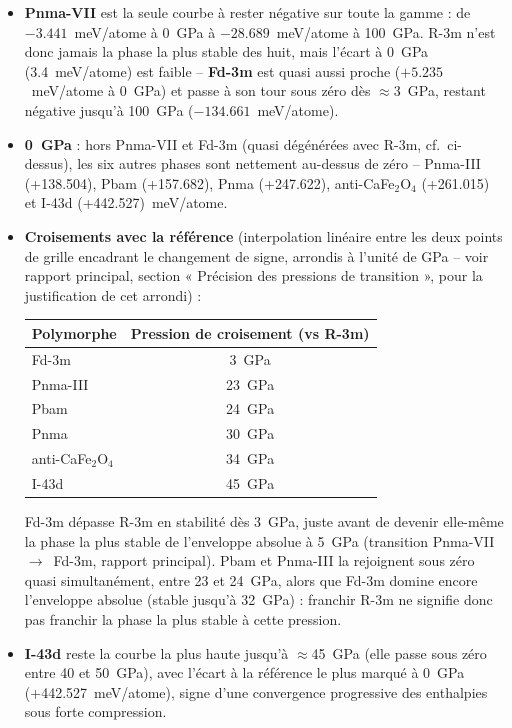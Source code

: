 \documentclass[11pt,a4paper]{article}
\begin{document}
\begin{itemize}
  \item \textbf{Pnma-VII} est la seule courbe à rester négative sur toute la gamme : de
  $-3.441$~meV/atome à 0~GPa à $-28.689$~meV/atome à 100~GPa. R-3m n'est donc jamais la phase la
  plus stable des huit, mais l'écart à 0~GPa (3.4~meV/atome) est faible -- \textbf{Fd-3m} est
  quasi aussi proche ($+5.235$~meV/atome à 0~GPa) et passe à son tour sous zéro dès
  $\approx$3~GPa, restant négative jusqu'à 100~GPa ($-134.661$~meV/atome).
  \item \textbf{0~GPa} : hors Pnma-VII et Fd-3m (quasi dégénérées avec R-3m, cf.\ ci-dessus), les
  six autres phases sont nettement au-dessus de zéro -- Pnma-III (+138.504), Pbam (+157.682),
  Pnma (+247.622), anti-CaFe$_2$O$_4$ (+261.015) et I-43d (+442.527)~meV/atome.
  \item \textbf{Croisements avec la référence} (interpolation linéaire entre les deux points de
  grille encadrant le changement de signe, arrondis à l'unité de GPa -- voir rapport principal,
  section « Précision des pressions de transition », pour la justification de cet arrondi) :
  \begin{center}
  \begin{tabular}{lc}
  \toprule
  Polymorphe & Pression de croisement (vs R-3m) \\
  \midrule
  Fd-3m              & 3~GPa \\
  Pnma-III           & 23~GPa \\
  Pbam               & 24~GPa \\
  Pnma               & 30~GPa \\
  anti-CaFe$_2$O$_4$ & 34~GPa \\
  I-43d              & 45~GPa \\
  \bottomrule
  \end{tabular}
  \end{center}
  Fd-3m dépasse R-3m en stabilité dès 3~GPa, juste avant de devenir elle-même la phase la plus
  stable de l'enveloppe absolue à 5~GPa (transition Pnma-VII~$\to$~Fd-3m, rapport principal).
  Pbam et Pnma-III la rejoignent sous zéro quasi simultanément, entre 23 et 24~GPa, alors que
  Fd-3m domine encore l'enveloppe absolue (stable jusqu'à 32~GPa) : franchir R-3m ne signifie
  donc pas franchir la phase la plus stable à cette pression.
  \item \textbf{I-43d} reste la courbe la plus haute jusqu'à $\approx$45~GPa (elle passe sous
  zéro entre 40 et 50~GPa), avec l'écart à la référence le plus marqué à 0~GPa
  (+442.527~meV/atome), signe d'une convergence progressive des enthalpies sous forte
  compression.
\end{itemize}
\end{document}
